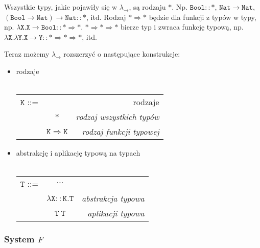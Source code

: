 \documentclass[11pt,leqno]{article}
\begin{document}
Wszystkie typy, jakie pojawiły się w $\lambda_{\rightarrow}$, są rodzaju $\mathtt{\ast}$. Np. $\mathtt{Bool :: \ast}$, $\mathtt{Nat \rightarrow Nat}$, $\mathtt{(Bool \rightarrow Nat) \rightarrow Nat} :: \ast$, itd. Rodzaj $\mathtt{\ast \Rightarrow \ast}$ będzie dla funkcji z typów w typy, np. $\mathtt{\lambda X.X \rightarrow Bool::\ast \Rightarrow \ast }$. $\mathtt{\ast \Rightarrow \ast \Rightarrow \ast}$ bierze typ i zwraca funkcję typową, np. $\mathtt{\lambda X. \lambda Y. X \rightarrow Y::\ast \Rightarrow \ast \Rightarrow \ast}$, itd. 

Teraz możemy $\lambda_{\rightarrow}$ rozszerzyć o następujące konstrukcje: 
\begin{itemize}
    \item rodzaje \\ \\
\begin{tabular}{| l c r |}
  \hline
  $\mathtt{K}$ ::= &  & rodzaje  \\
   & $\mathtt{\ast}$ & \textit{rodzaj wszystkich typów} \\
   & $\mathtt{K \Rightarrow K}$ & \textit{rodzaj funkcji typowej} \\
  \hline
\end{tabular}
    \item abstrakcję i aplikację typową na typach \\ \\
\begin{tabular}{| l c r |}
   \hline
   $\mathtt{T}$ ::= & $\cdots$ &  \\
   & $\mathtt{\lambda X::K.T}$ & \textit{abstrakcja typowa} \\
   & $\mathtt{T\;T}$ & \textit{aplikacji typowa} \\
   \hline
\end{tabular}
\end{itemize} 


\subsubsection{System $F$}
\end{document}
